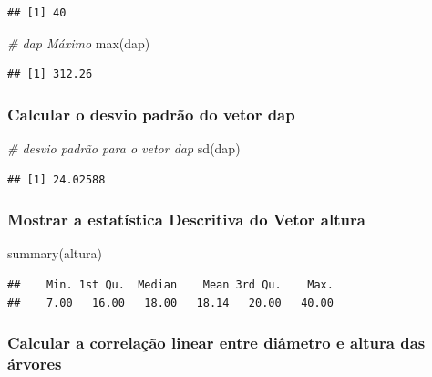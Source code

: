 \documentclass[
]{article}
\newenvironment{Shaded}{\begin{snugshade}}{\end{snugshade}}
\newcommand{\CommentTok}[1]{\textcolor[rgb]{0.56,0.35,0.01}{\textit{#1}}}
\newcommand{\FunctionTok}[1]{\textcolor[rgb]{0.00,0.00,0.00}{#1}}
\newcommand{\NormalTok}[1]{#1}
\begin{document}
\begin{verbatim}
## [1] 40
\end{verbatim}

\begin{Shaded}
\begin{Highlighting}[]
\CommentTok{\# dap Máximo}
\FunctionTok{max}\NormalTok{(dap)}
\end{Highlighting}
\end{Shaded}

\begin{verbatim}
## [1] 312.26
\end{verbatim}

\hypertarget{calcular-o-desvio-padruxe3o-do-vetor-dap}{%
\subsubsection{Calcular o desvio padrão do vetor
dap}\label{calcular-o-desvio-padruxe3o-do-vetor-dap}}

\begin{Shaded}
\begin{Highlighting}[]
\CommentTok{\# desvio padrão para o vetor dap}
\FunctionTok{sd}\NormalTok{(dap)}
\end{Highlighting}
\end{Shaded}

\begin{verbatim}
## [1] 24.02588
\end{verbatim}

\hypertarget{mostrar-a-estatuxedstica-descritiva-do-vetor-altura}{%
\subsubsection{Mostrar a estatística Descritiva do Vetor
altura}\label{mostrar-a-estatuxedstica-descritiva-do-vetor-altura}}

\begin{Shaded}
\begin{Highlighting}[]
\FunctionTok{summary}\NormalTok{(altura)}
\end{Highlighting}
\end{Shaded}

\begin{verbatim}
##    Min. 1st Qu.  Median    Mean 3rd Qu.    Max. 
##    7.00   16.00   18.00   18.14   20.00   40.00
\end{verbatim}

\hypertarget{calcular-a-correlauxe7uxe3o-linear-entre-diuxe2metro-e-altura-das-uxe1rvores}{%
\subsubsection{Calcular a correlação linear entre diâmetro e altura das
árvores}\label{calcular-a-correlauxe7uxe3o-linear-entre-diuxe2metro-e-altura-das-uxe1rvores}}
\end{document}
